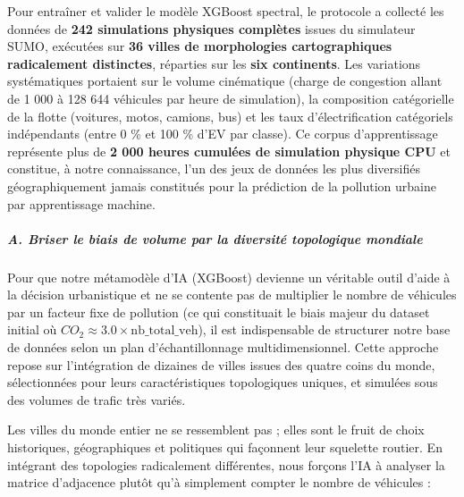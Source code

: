 \documentclass[10pt, a4paper]{article}
\begin{document}
Pour entraîner et valider le modèle XGBoost spectral, le protocole a
collecté les données de \textbf{242 simulations physiques complètes}
issues du simulateur SUMO, exécutées sur \textbf{36 villes de
morphologies cartographiques radicalement distinctes}, réparties sur les
\textbf{six continents}. Les variations systématiques portaient sur le
volume cinématique (charge de congestion allant de 1 000 à 128 644
véhicules par heure de simulation), la composition catégorielle de la
flotte (voitures, motos, camions, bus) et les taux d'électrification
catégoriels indépendants (entre 0 \% et 100 \% d'EV par classe). Ce
corpus d'apprentissage représente plus de \textbf{2 000 heures cumulées
de simulation physique CPU} et constitue, à notre connaissance, l'un des
jeux de données les plus diversifiés géographiquement jamais constitués
pour la prédiction de la pollution urbaine par apprentissage machine.

\subparagraph{A. Briser le biais de volume par la diversité topologique
mondiale}\label{a.-briser-le-biais-de-volume-par-la-diversituxe9-topologique-mondiale}

Pour que notre métamodèle d'IA (XGBoost) devienne un véritable outil
d'aide à la décision urbanistique et ne se contente pas de multiplier le
nombre de véhicules par un facteur fixe de pollution (ce qui constituait
le biais majeur du dataset initial où
\(CO_2 \approx 3.0 \times \text{nb\_total\_veh}\)), il est indispensable
de structurer notre base de données selon un plan d'échantillonnage
multidimensionnel. Cette approche repose sur l'intégration de dizaines
de villes issues des quatre coins du monde, sélectionnées pour leurs
caractéristiques topologiques uniques, et simulées sous des volumes de
trafic très variés.

Les villes du monde entier ne se ressemblent pas ; elles sont le fruit
de choix historiques, géographiques et politiques qui façonnent leur
squelette routier. En intégrant des topologies radicalement différentes,
nous forçons l'IA à analyser la matrice d'adjacence plutôt qu'à
simplement compter le nombre de véhicules :
\end{document}
